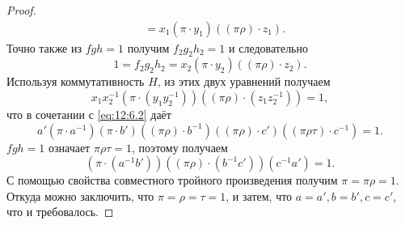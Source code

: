 \begin{proof}
\begin{align*}
       & = x_1 (\pi \cdot y_1)((\pi \rho) \cdot z_1).
  \end{align*}
  Точно также из $fgh=1$ получим $f_2 g_2 h_2 = 1$ и следовательно
  \[
  	1 = f_2 g_2 h_2 = x_2 (\pi  \cdot y_2)((\pi \rho) \cdot z_2).
  \]
  Используя коммутативность $H$, из этих двух уравнений получаем
  \[
  	x_1 x_2^{-1} (\pi \cdot (y_1 y_2^{-1}))((\pi \rho) \cdot (z_1 z_2^{-1})) = 1,
  \]
  что в сочетании с \eqref{eq:12:6.2} даёт
  \[
  	a' (\pi \cdot a^{-1}) (\pi \cdot b')((\pi \rho) \cdot b^{-1})((\pi \rho) \cdot c')((\pi \rho \tau) \cdot c^{-1}) = 1.
  \]
  $f g h = 1$ означает $\pi \rho \tau = 1$, поэтому получаем
  \[
  	(\pi \cdot (a^{-1} b'))((\pi \rho) \cdot (b^{-1} c'))(c^{-1} a') = 1.
  \]
  С помощью свойства совместного тройного произведения получим $\pi = \pi \rho = 1$. Откуда можно заключить, что $\pi = \rho = \tau = 1$, и затем, что $a=a', b=b', c=c'$, что и требовалось.
\end{proof}

